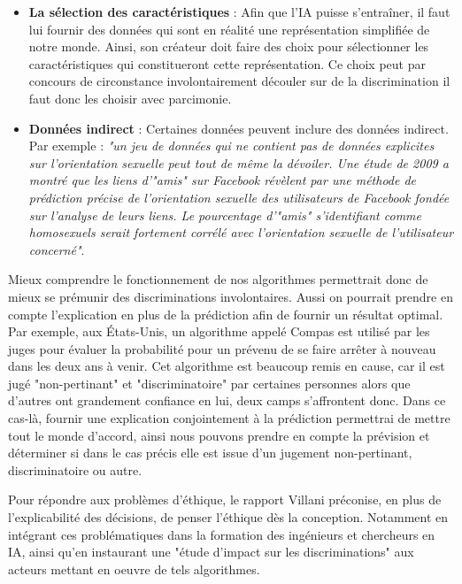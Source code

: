 \begin{itemize}
    \item \textbf{La sélection des caractéristiques} : Afin que l'IA puisse s'entraîner, il faut lui fournir des données qui sont en réalité une représentation simplifiée de notre monde. Ainsi, son créateur doit faire des choix pour sélectionner les caractéristiques qui constitueront cette représentation. Ce choix peut par concours de circonstance involontairement découler sur de la discrimination il faut donc les choisir avec parcimonie.
    \item \textbf{Données indirect} : Certaines données peuvent inclure des données indirect. Par exemple : \textit{"un jeu de données qui ne contient pas de données explicites sur l’orientation sexuelle peut tout de même la dévoiler. Une étude de 2009 a montré que les liens d’"amis" sur Facebook révèlent par une méthode de prédiction précise de l’orientation sexuelle des utilisateurs de Facebook fondée sur l’analyse de leurs liens. Le pourcentage d’"amis" s’identifiant comme homosexuels serait fortement corrélé avec l’orientation sexuelle de l’utilisateur concerné"}\cite{dicriminationAlgo}.
\end{itemize}
Mieux comprendre le fonctionnement de nos algorithmes permettrait donc de mieux se prémunir des discriminations involontaires. Aussi on pourrait prendre en compte l'explication en plus de la prédiction afin de fournir un résultat optimal. Par exemple, aux États-Unis, un algorithme appelé Compas est utilisé par les juges pour évaluer la probabilité pour un prévenu de se faire arrêter à nouveau dans les deux ans à venir. Cet algorithme est beaucoup remis en cause, car il est jugé "non-pertinant" et "discriminatoire" par certaines personnes alors que d'autres ont grandement confiance en lui, deux camps s'affrontent donc. Dans ce cas-là, fournir une explication conjointement à la prédiction permettrai de mettre tout le monde d'accord, ainsi nous pouvons prendre en compte la prévision et déterminer si dans le cas précis elle est issue d'un jugement non-pertinant, discriminatoire ou autre.\par
Pour répondre aux problèmes d'éthique, le rapport Villani préconise, en plus de l'explicabilité des décisions, de penser l'éthique dès la conception. Notamment en intégrant ces problématiques dans la formation des ingénieurs et chercheurs en IA, ainsi qu'en instaurant une "étude d’impact sur les discriminations" aux acteurs mettant en oeuvre de tels algorithmes. 
